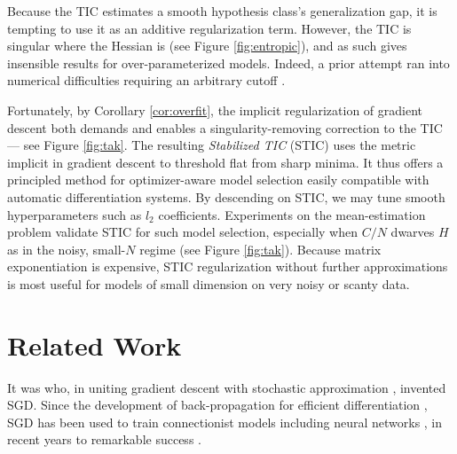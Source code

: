 \documentclass{article}
\theoremstyle{plain}
\theoremstyle{definition}
\begin{document}
        Because the TIC estimates a smooth hypothesis class's generalization
        gap, it is tempting to use it as an additive regularization term.
        However, the TIC is singular where the Hessian is (see Figure
        \ref{fig:entropic}), and as such gives insensible results for
        over-parameterized models.  Indeed, a prior attempt ran into numerical
        difficulties requiring an arbitrary cutoff \citep{di18}. 

        Fortunately, by Corollary \ref{cor:overfit}, the implicit
        regularization of gradient descent both demands and enables a
        singularity-removing correction to the TIC --- see Figure
        \ref{fig:tak}.  The resulting \emph{Stabilized TIC} (STIC) uses the
        metric implicit in gradient descent to threshold flat from sharp
        minima.  It thus offers a principled method for optimizer-aware model
        selection easily compatible with automatic differentiation systems.  By
        descending on STIC, we may tune smooth hyperparameters such as $l_2$
        coefficients.  Experiments on the mean-estimation problem validate STIC
        for such model selection, especially when $C/N$ dwarves $H$ as in the
        noisy, small-$N$ regime (see Figure \ref{fig:tak}).  Because matrix
        exponentiation is expensive, STIC regularization without further
        approximations is most useful for models of small dimension
        on very noisy or scanty data.


\section{Related Work}


    It was \citet{ki52} who, in uniting gradient descent \citep{ca47} with
    stochastic approximation \citep{ro51}, invented SGD.  Since the development
    of back-propagation for efficient differentiation \citep{we74}, SGD
    has been used to train connectionist models including neural
    networks \citep{bo91}, in recent years to remarkable success \citep{le15}.
\end{document}
